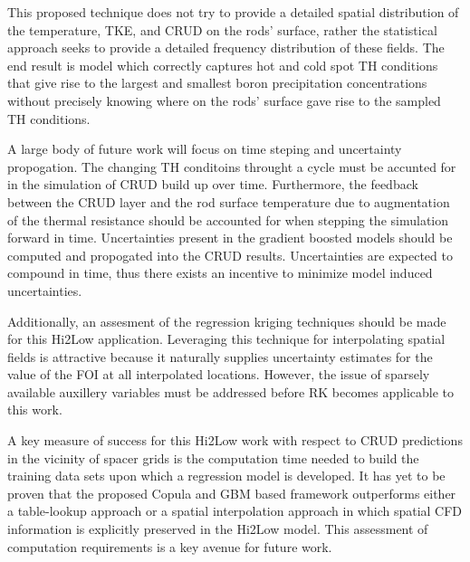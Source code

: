 
This proposed technique does not try to provide a detailed spatial distribution
of the temperature, TKE, and CRUD on the rods' surface, rather the
statistical approach seeks to provide a detailed frequency distribution
of these fields.  The end result is model which correctly captures hot and cold
spot TH conditions that give rise to the largest and smallest boron
precipitation concentrations without precisely knowing where on the rods'
surface gave rise to the sampled TH conditions.

A large body of future work will focus on time steping and uncertainty propogation.
The changing TH conditoins throught a cycle must be accunted for in the simulation of CRUD build up over time.  Furthermore, the feedback between the CRUD layer and the rod surface temperature due to augmentation of the thermal resistance should be accounted for when stepping the simulation forward in time.
Uncertainties present in the gradient boosted models should be computed and
propogated into the CRUD results.   Uncertainties are expected to compound in time, thus there exists an incentive to minimize model induced uncertainties.

Additionally, an assesment of the regression kriging techniques should be made for this Hi2Low application.  Leveraging this technique for interpolating spatial fields is attractive because it naturally supplies uncertainty estimates for the value of the FOI at all interpolated locations.  However, the issue of sparsely available auxillery variables must be addressed before RK becomes applicable to this work.

A key measure of success for this Hi2Low work with respect to  CRUD predictions
in the vicinity of spacer grids is the computation time needed to build the
training data sets upon which a regression model is developed.
It has yet to be proven that the proposed Copula and GBM based framework outperforms
either a table-lookup approach or a spatial interpolation approach in which
spatial CFD information is explicitly preserved in the Hi2Low model.  This assessment
of computation requirements is a key avenue for future work.